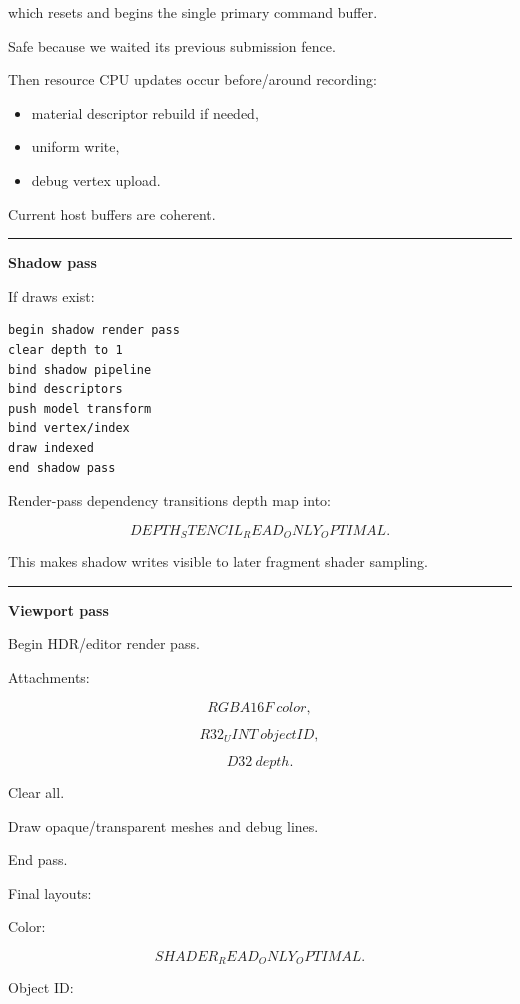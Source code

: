 which resets and begins the single primary command buffer.

Safe because we waited its previous submission fence.

Then resource CPU updates occur before/around recording:

\begin{itemize}
\tightlist
\item
  material descriptor rebuild if needed,
\item
  uniform write,
\item
  debug vertex upload.
\end{itemize}

Current host buffers are coherent.

\begin{center}\rule{0.5\linewidth}{0.5pt}\end{center}

\textbf{Shadow pass}

If draws exist:

\begin{verbatim}
begin shadow render pass
clear depth to 1
bind shadow pipeline
bind descriptors
push model transform
bind vertex/index
draw indexed
end shadow pass
\end{verbatim}

Render-pass dependency transitions depth map into:

\[
DEPTH_STENCIL_READ_ONLY_OPTIMAL.
\]

This makes shadow writes visible to later fragment shader sampling.

\begin{center}\rule{0.5\linewidth}{0.5pt}\end{center}

\textbf{Viewport pass}

Begin HDR/editor render pass.

Attachments:

\[
RGBA16F\ color,
\]

\[
R32_UINT\ objectID,
\]

\[
D32\ depth.
\]

Clear all.

Draw opaque/transparent meshes and debug lines.

End pass.

Final layouts:

Color:

\[
SHADER_READ_ONLY_OPTIMAL.
\]

Object ID:

